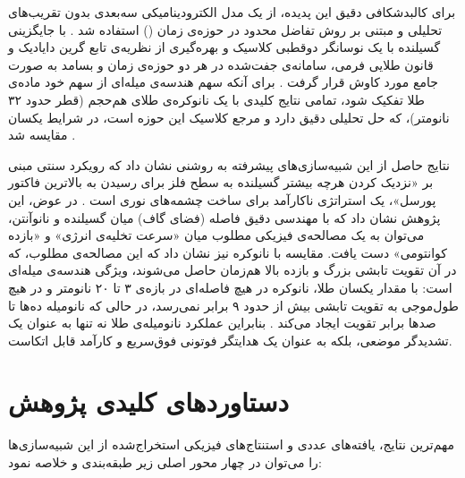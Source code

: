 \documentclass[12pt,a4paper]{report}
\begin{document}
برای کالبدشکافی دقیق این پدیده، از یک مدل الکترودینامیکی سه‌بعدی بدون تقریب‌های تحلیلی و مبتنی بر روش تفاضل محدود در حوزه‌ی زمان () استفاده شد \cite{taflove}. با جایگزینی گسیلنده با یک نوسانگر دوقطبی کلاسیک و بهره‌گیری از نظریه‌ی تابع گرین دایادیک و قانون طلایی فرمی، سامانه‌ی جفت‌شده در هر دو حوزه‌ی زمان و بسامد به صورت جامع مورد کاوش قرار گرفت \cite{novotny,maier}. برای آنکه سهم هندسه‌ی میله‌ای از سهم خود ماده‌ی طلا تفکیک شود، تمامی نتایج کلیدی با یک نانوکره‌ی طلای هم‌حجم (قطر حدود ۳۲ نانومتر)، که حل تحلیلی دقیق دارد و مرجع کلاسیک این حوزه است، در شرایط یکسان مقایسه شد \cite{ruppin,gersten,mertens}.

نتایج حاصل از این شبیه‌سازی‌های پیشرفته به روشنی نشان داد که رویکرد سنتی مبنی بر «نزدیک کردن هرچه بیشتر گسیلنده به سطح فلز برای رسیدن به بالاترین فاکتور پورسل»، یک استراتژی ناکارآمد برای ساخت چشمه‌های نوری است \cite{koenderink,novotny}. در عوض، این پژوهش نشان داد که با مهندسی دقیق فاصله (فضای گاف) میان گسیلنده و نانوآنتن، می‌توان به یک مصالحه‌ی فیزیکی مطلوب میان «سرعت تخلیه‌ی انرژی» و «بازده کوانتومی» دست یافت. مقایسه با نانوکره نیز نشان داد که این مصالحه‌ی مطلوب، که در آن تقویت تابشی بزرگ و بازده بالا هم‌زمان حاصل می‌شوند، ویژگی هندسه‌ی میله‌ای است: با مقدار یکسان طلا، نانوکره در هیچ فاصله‌ای در بازه‌ی ۳ تا ۲۰ نانومتر و در هیچ طول‌موجی به تقویت تابشی بیش از حدود ۹ برابر نمی‌رسد، در حالی که نانومیله ده‌ها تا صدها برابر تقویت ایجاد می‌کند \cite{novotny,maier,khatua}. بنابراین عملکرد نانومیله‌ی طلا نه تنها به عنوان یک تشدیدگر موضعی، بلکه به عنوان یک هدایتگر فوتونی فوق‌سریع و کارآمد قابل اتکاست.

\section{دستاوردهای کلیدی پژوهش}
مهم‌ترین نتایج، یافته‌های عددی و استنتاج‌های فیزیکی استخراج‌شده از این شبیه‌سازی‌ها را می‌توان در چهار محور اصلی زیر طبقه‌بندی و خلاصه نمود:
\end{document}
